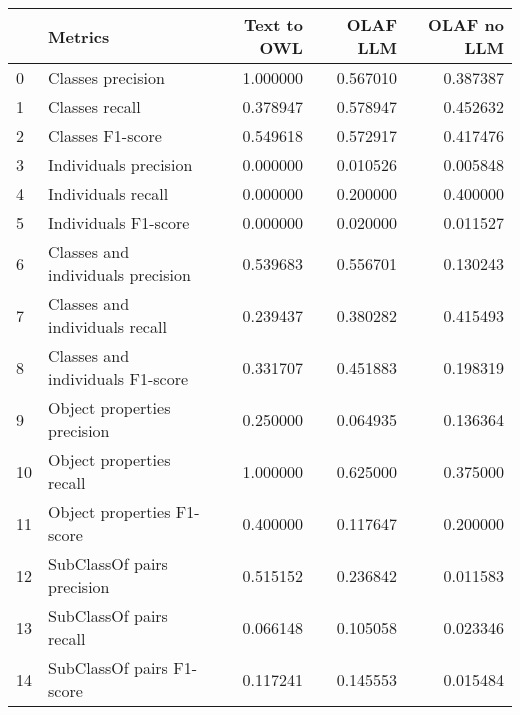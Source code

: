 \begin{tabular}{llrrr}
\toprule
 & Metrics & Text to OWL & OLAF LLM & OLAF no LLM \\
\midrule
0 & Classes precision & 1.000000 & 0.567010 & 0.387387 \\
1 & Classes recall & 0.378947 & 0.578947 & 0.452632 \\
2 & Classes F1-score & 0.549618 & 0.572917 & 0.417476 \\
3 & Individuals precision & 0.000000 & 0.010526 & 0.005848 \\
4 & Individuals recall & 0.000000 & 0.200000 & 0.400000 \\
5 & Individuals F1-score & 0.000000 & 0.020000 & 0.011527 \\
6 & Classes and individuals precision & 0.539683 & 0.556701 & 0.130243 \\
7 & Classes and individuals recall & 0.239437 & 0.380282 & 0.415493 \\
8 & Classes and individuals F1-score & 0.331707 & 0.451883 & 0.198319 \\
9 & Object properties precision & 0.250000 & 0.064935 & 0.136364 \\
10 & Object properties recall & 1.000000 & 0.625000 & 0.375000 \\
11 & Object properties F1-score & 0.400000 & 0.117647 & 0.200000 \\
12 & SubClassOf pairs precision & 0.515152 & 0.236842 & 0.011583 \\
13 & SubClassOf pairs recall & 0.066148 & 0.105058 & 0.023346 \\
14 & SubClassOf pairs F1-score & 0.117241 & 0.145553 & 0.015484 \\
\bottomrule
\end{tabular}
